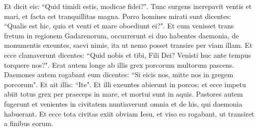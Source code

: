 \begin{biblechapter}
\verse Et dicit eis: “Quid timidi estis, modicae fidei?". Tunc surgens increpavit ventis et mari, et facta est tranquillitas magna. 
\verse Porro homines mirati sunt dicentes: “Qualis est hic, quia et venti et mare oboediunt ei?". 
\verse Et cum venisset trans fretum in regionem Gadarenorum, occurrerunt ei duo habentes daemonia, de monumentis exeuntes, saevi nimis, ita ut nemo posset transire per viam illam. 
\verse Et ecce clamaverunt dicentes: “Quid nobis et tibi, Fili Dei? Venisti huc ante tempus torquere nos?". 
\verse Erat autem longe ab illis grex porcorum multorum pascens. 
\verse Daemones autem rogabant eum dicentes: “Si eicis nos, mitte nos in gregem porcorum". 
\verse Et ait illis: “Ite". Et illi exeuntes abierunt in porcos; et ecce impetu abiit totus grex per praeceps in mare, et mortui sunt in aquis. 
\verse Pastores autem fugerunt et venientes in civitatem nuntiaverunt omnia et de his, qui daemonia habuerant. 
\verse Et ecce tota civitas exiit obviam Iesu, et viso eo rogabant, ut transiret a finibus eorum. 
\end{biblechapter}

